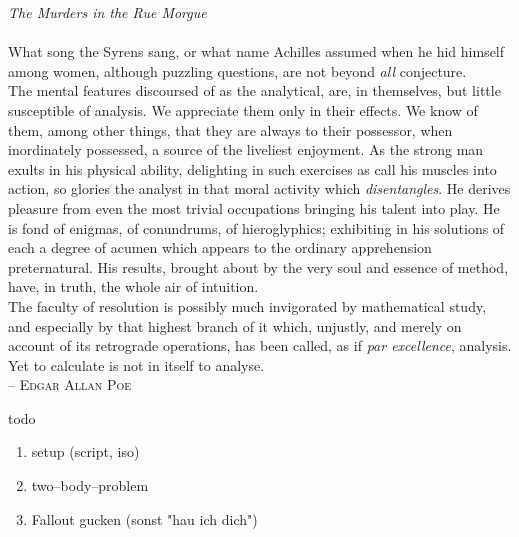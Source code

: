 \documentclass{article}
\begin{document}
\Huge
\textit{The Murders in the Rue Morgue}\\\\
What song the Syrens sang, or what name Achilles assumed when he hid himself among women, although puzzling questions, are not beyond \textit{all} conjecture.\\\indent
The mental features discoursed of as the analytical, are, in themselves, but little susceptible of analysis. 
We appreciate them only in their effects. 
We know of them, among other things, that they are always to their possessor, when inordinately possessed, a source of the liveliest enjoyment.
As the strong man exults in his physical ability, delighting in such exercises as call his muscles into action, so glories the analyst in that moral activity which \textit{disentangles}.
He derives pleasure from even the most trivial occupations bringing his talent into play.
He is fond of enigmas, of conundrums, of hieroglyphics; exhibiting in his solutions of each a degree of acumen which appears to the ordinary apprehension preternatural.
His results, brought about by the very soul and essence of method, have, in truth, the whole air of intuition.\\\indent
The faculty of resolution is possibly much invigorated by mathematical study, and especially by that highest branch of it which, unjustly, and merely on account of its retrograde operations, has been called, as if \textit{par excellence}, analysis. 
Yet to calculate is not in itself to analyse.\\
\null\hfill -- \textsc{Edgar Allan Poe}


\color{fg}

\vfill

\noindent todo
\begin{enumerate}[label=$\Box$]
        \item setup (script, iso)
        \item two--body--problem
        \item Fallout gucken (sonst "hau ich dich")
\end{enumerate}
\end{document}
